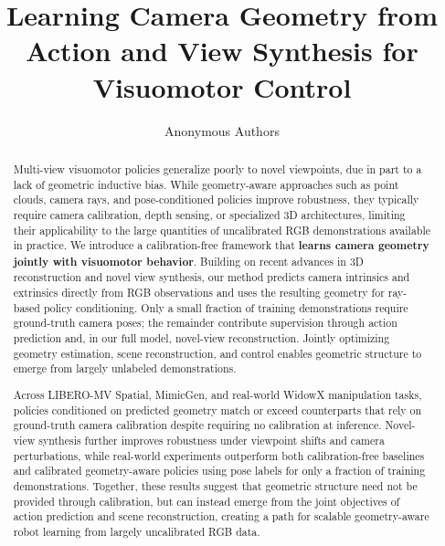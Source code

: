 \documentclass{article}
\title{Learning Camera Geometry from Action and View Synthesis for Visuomotor Control}
\author{
  Anonymous Authors
}
\begin{document}
\maketitle

\begin{abstract}
Multi-view visuomotor policies generalize poorly to novel viewpoints, due in part to a lack of geometric inductive bias. While geometry-aware approaches such as point clouds, camera rays, and pose-conditioned policies improve robustness, they typically require camera calibration, depth sensing, or specialized 3D architectures, limiting their applicability to the large quantities of uncalibrated RGB demonstrations available in practice. We introduce a calibration-free framework that \textbf{learns camera geometry jointly with visuomotor behavior}. Building on recent advances in 3D reconstruction and novel view synthesis, our method predicts camera intrinsics and extrinsics directly from RGB observations and uses the resulting geometry for ray-based policy conditioning. Only a small fraction of training demonstrations require ground-truth camera poses; the remainder contribute supervision through action prediction and, in our full model, novel-view reconstruction. Jointly optimizing geometry estimation, scene reconstruction, and control enables geometric structure to emerge from largely unlabeled demonstrations.

Across LIBERO-MV Spatial, MimicGen, and real-world WidowX manipulation tasks, policies conditioned on predicted geometry match or exceed counterparts that rely on ground-truth camera calibration despite requiring no calibration at inference. Novel-view synthesis further improves robustness under viewpoint shifts and camera perturbations, while real-world experiments outperform both calibration-free baselines and calibrated geometry-aware policies using pose labels for only a fraction of training demonstrations. Together, these results suggest that geometric structure need not be provided through calibration, but can instead emerge from the joint objectives of action prediction and scene reconstruction, creating a path for scalable geometry-aware robot learning from largely uncalibrated RGB data.





\end{abstract}
\end{document}
